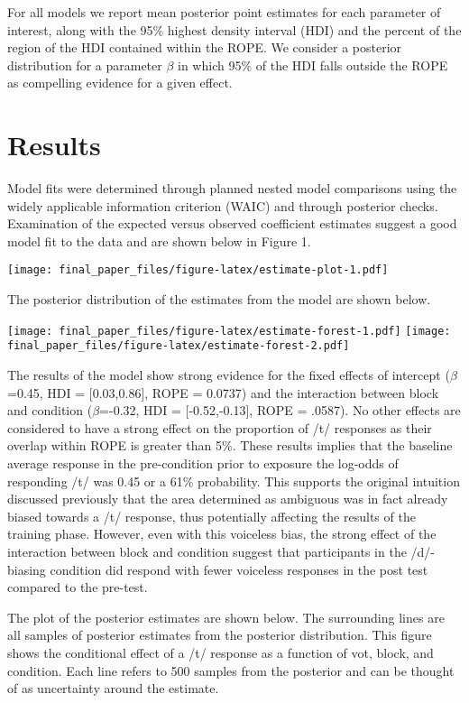 \documentclass[
  english,
  man]{apa6}
\begin{document}
For all models we report mean posterior point estimates for each parameter of interest, along with the 95\% highest density interval (HDI) and the percent of the region of the HDI contained within the ROPE. We consider a posterior distribution for a parameter \(\beta\) in which 95\% of the HDI falls outside the ROPE as compelling evidence for a given effect.

\hypertarget{results}{%
\section{Results}\label{results}}

Model fits were determined through planned nested model comparisons using the widely applicable information criterion (WAIC) and through posterior checks. Examination of the expected versus observed coefficient estimates suggest a good model fit to the data and are shown below in Figure 1.

\texttt{[image: final\_paper\_files/figure-latex/estimate-plot-1.pdf]}

The posterior distribution of the estimates from the model are shown below.

\texttt{[image: final\_paper\_files/figure-latex/estimate-forest-1.pdf]} \texttt{[image: final\_paper\_files/figure-latex/estimate-forest-2.pdf]}

The results of the model show strong evidence for the fixed effects of intercept (\(\beta\)=0.45, HDI = {[}0.03,0.86{]}, ROPE = 0.0737) and the interaction between block and condition (\(\beta\)=-0.32, HDI = {[}-0.52,-0.13{]}, ROPE = .0587). No other effects are considered to have a strong effect on the proportion of /t/ responses as their overlap within ROPE is greater than 5\%. These results implies that the baseline average response in the pre-condition prior to exposure the log-odds of responding /t/ was 0.45 or a 61\% probability. This supports the original intuition discussed previously that the area determined as ambiguous was in fact already biased towards a /t/ response, thus potentially affecting the results of the training phase. However, even with this voiceless bias, the strong effect of the interaction between block and condition suggest that participants in the /d/-biasing condition did respond with fewer voiceless responses in the post test compared to the pre-test.

The plot of the posterior estimates are shown below. The surrounding lines are all samples of posterior estimates from the posterior distribution. This figure shows the conditional effect of a /t/ response as a function of vot, block, and condition. Each line refers to 500 samples from the posterior and can be thought of as uncertainty around the estimate.
\end{document}
